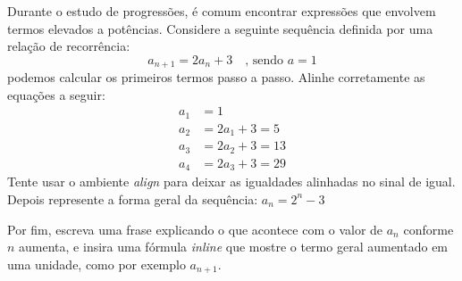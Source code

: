 \documentclass{article}
\begin{document}
Durante o estudo de progressões, é comum encontrar expressões que envolvem termos elevados a potências.
Considere a seguinte sequência definida por uma relação de recorrência:
\begin{equation}
    a_{n+1} = 2a_n + 3 \quad \text{, sendo $a = 1$}
\end{equation}    
podemos calcular os primeiros termos passo a passo. Alinhe corretamente as equações a seguir:
\begin{align*}
    a_1 &= 1\\
    a_2 &= 2a_1 + 3 = 5\\
    a_3 &= 2a_2 + 3 = 13\\
    a_4 &= 2a_3 + 3 = 29
\end{align*}
Tente usar o ambiente \textit{align} para deixar as igualdades alinhadas no sinal de igual. Depois represente a forma geral da sequência:
$a_n = 2^n - 3$

Por fim, escreva uma frase explicando o que acontece com o valor de 
$a_n$ conforme  $n$ aumenta, e insira uma fórmula \textit{inline} que mostre o termo geral aumentado em uma unidade, como por exemplo $a_{n+1}$.    
\end{document}
